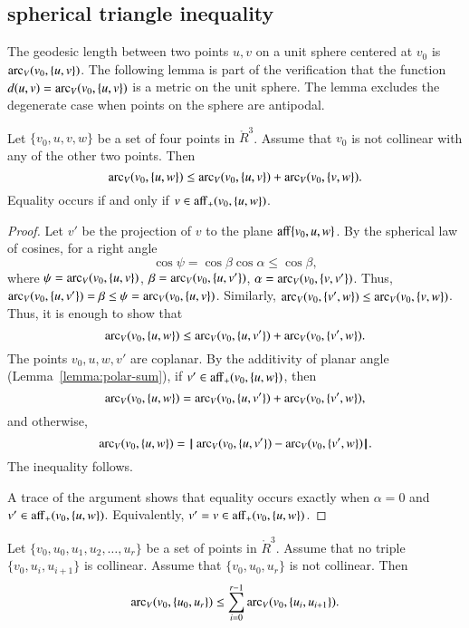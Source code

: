 \subsection{spherical triangle inequality}

The geodesic length between two points
$u,v$ on a unit sphere centered at $v_0$ is $\operatorname{arc}_V(v_0,\{u,v\})$.
The following lemma is part of the verification that
the function $d(u,v) = \operatorname{arc}_V(v_0,\{u,v\})$ is a metric
on the unit sphere.  The lemma excludes the degenerate case when
points on the sphere are antipodal.

\begin{lemma}\label{lemma:sph-tri-ineq}
Let $\{v_0,u,v,w\}$ be a set of four points in $\ring{R}^3$.
Assume that $v_0$ is not collinear with any of the other two points.
Then
   $$
   \operatorname{arc}_V(v_0,\{u,w\}) \le \operatorname{arc}_V(v_0,\{u,v\}) + \operatorname{arc}_V(v_0,\{v,w\}).
   $$
Equality occurs if and only if $v\in{\operatorname{aff}}_+(v_0,\{u,w\})$.
\end{lemma}

\begin{proof} Let $v'$ be the projection of $v$ to the plane
${\operatorname{aff}}\{v_0,u,w\}$.  
By the spherical law of cosines, for a right angle
   $$
   \cos\psi = \cos\beta\cos\alpha \le \cos\beta,
   $$
where $\psi = \operatorname{arc}_V(v_0,\{u,v\})$, $\beta = \operatorname{arc}_V(v_0,\{u,v'\})$, $\alpha=\operatorname{arc}_V(v_0,\{v,v'\})$.
Thus, $\operatorname{arc}_V(v_0,\{u,v'\})=\beta\le \psi=\operatorname{arc}_V(v_0,\{u,v\})$.
Similarly, $\operatorname{arc}_V(v_0,\{v',w\}) \le \operatorname{arc}_V(v_0,\{v,w\})$.
Thus, it is enough to show that 
  $$
  \operatorname{arc}_V(v_0,\{u,w\}) \le \operatorname{arc}_V(v_0,\{u,v'\}) + \operatorname{arc}_V(v_0,\{v',w\}).
  $$
The points $v_0,u,w,v'$ are coplanar.
By the additivity of planar angle (Lemma~\ref{lemma:polar-sum}), if 
$v'\in {\operatorname{aff}}_+(v_0,\{u,w\})$, then
   $$
   \operatorname{arc}_V(v_0,\{u,w\}) = \operatorname{arc}_V(v_0,\{u,v'\}) + \operatorname{arc}_V(v_0,\{v',w\}),   
   $$
and otherwise,
   $$
   \operatorname{arc}_V(v_0,\{u,w\}) = {\hskip0.1em|\hskip-0.15em|\hskip0.1em}\operatorname{arc}_V(v_0,\{u,v'\})  -  \operatorname{arc}_V(v_0,\{v',w\}){\hskip0.1em|\hskip-0.15em|\hskip0.1em}.
   $$
The inequality follows.

A trace of the argument shows that equality occurs exactly when
$\alpha=0$ and $v'\in {\operatorname{aff}}_+(v_0,\{u,w\})$.  Equivalently,
$v'=v\in{\operatorname{aff}}_+(v_0,\{u,w\})$.
\end{proof}

\begin{lemma}
\label{lemma:sph-tri-multi}
Let $\{v_0,u_0,u_1,u_2,\ldots,u_r\}$ be a set of points in $\ring{R}^3$.
Assume that no triple $\{v_0,u_i,u_{i+1}\}$ is collinear.  Assume
that $\{v_0,u_0,u_r\}$ is not collinear.  Then
$$
  \operatorname{arc}_V(v_0,\{u_0,u_r\}) \le \sum_{i=0}^{r-1} \operatorname{arc}_V(v_0,\{u_i,u_{i+1}\}).
$$
\end{lemma}


